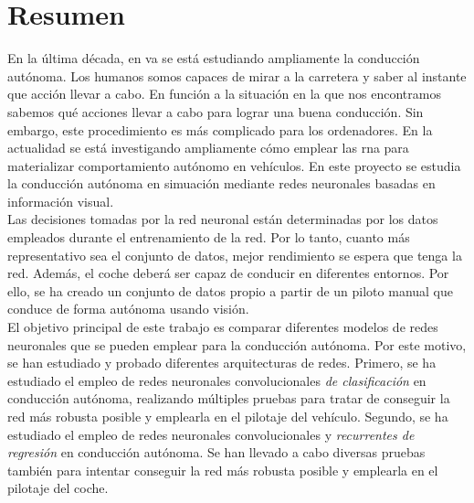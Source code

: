 \chapter*{Resumen}

En la última década, en \acrfull{va} se está estudiando ampliamente la conducción autónoma. Los humanos somos capaces de mirar a la carretera y saber al instante que acción llevar a cabo. En función a la situación en la que nos encontramos sabemos qué acciones llevar a cabo para lograr una buena conducción.  Sin embargo, este procedimiento es más complicado para los ordenadores. En la actualidad se está investigando ampliamente cómo emplear las \acrfull{rna} para materializar comportamiento autónomo en vehículos. En este proyecto se estudia la conducción autónoma en simuación mediante redes neuronales basadas en información visual.\\

Las decisiones tomadas por la red neuronal están determinadas por los datos empleados durante el entrenamiento de la red. Por lo tanto, cuanto más representativo sea el conjunto de datos, mejor rendimiento se espera que tenga la red. Además, el coche deberá ser capaz de conducir en diferentes entornos. Por ello, se ha creado un conjunto de datos propio a partir de un piloto manual que conduce de forma autónoma usando visión.\\


El objetivo principal de este trabajo es comparar diferentes modelos de redes neuronales que se pueden emplear para la conducción autónoma. Por este motivo, se han estudiado y probado diferentes arquitecturas de redes. Primero, se ha estudiado el empleo de redes neuronales convolucionales \textit{de clasificación} en conducción autónoma, realizando múltiples pruebas para tratar de conseguir la red más robusta posible y emplearla en el pilotaje del vehículo. Segundo, se ha estudiado el empleo de redes neuronales convolucionales y \textit{recurrentes de regresión} en conducción autónoma. Se han llevado a cabo diversas pruebas también para intentar conseguir la red más robusta posible y emplearla en el pilotaje del coche.